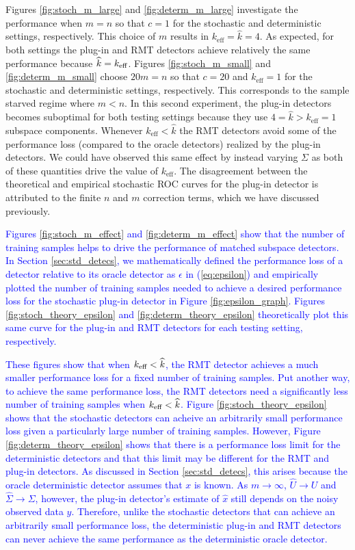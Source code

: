 Figures \ref{fig:stoch_m_large} and \ref{fig:determ_m_large} investigate the performance when $m=n$ so that $c=1$ for the stochastic and deterministic settings, respectively. This choice of $m$ results in $k_\text{eff}=\widehat{k}=4$. As expected, for both settings the plug-in and RMT detectors achieve relatively the same performance because $\widehat{k}=k_\text{eff}$. Figures \ref{fig:stoch_m_small} and \ref{fig:determ_m_small} choose $20m=n$ so that $c=20$ and $k_\text{eff}=1$ for the stochastic and deterministic settings, respectively. This corresponds to the sample starved regime where $m<n$. In this second experiment, the plug-in detectors becomes suboptimal for both testing settings because they use $4=\widehat{k} > k_\text{eff}=1$ subspace components. Whenever $k_\text{eff}<\widehat{k}$ the RMT detectors avoid some of the performance loss (compared to the oracle detectors) realized by the plug-in detectors. We could have observed this same effect by instead varying $\Sigma$ as both of these quantities drive the value of $k_\text{eff}$. The disagreement between the theoretical and empirical stochastic ROC curves for the plug-in detector is attributed to the finite $n$ and $m$ correction terms, which we have discussed previously.

\textcolor{blue}{Figures \ref{fig:stoch_m_effect} and \ref{fig:determ_m_effect} show that the number of training samples helps to drive the performance of matched subspace detectors. In Section \ref{sec:std_detecs}, we mathematically defined the performance loss of a detector relative to its oracle detector as $\epsilon$ in (\ref{eq:epsilon}) and empirically plotted the number of training samples needed to achieve a desired performance loss for the stochastic plug-in detector in Figure \ref{fig:epsilon_graph}. Figures \ref{fig:stoch_theory_epsilon} and \ref{fig:determ_theory_epsilon} theoretically plot this same curve for the plug-in and RMT detectors for each testing setting, respectively.}

\textcolor{blue}{These figures show that when $k_\text{eff}<\widehat{k}$, the RMT detector achieves a much smaller performance loss for a fixed number of training samples. Put another way, to achieve the same performance loss, the RMT detectors need a significantly less number of training samples when $k_\text{eff}<\widehat{k}$. Figure \ref{fig:stoch_theory_epsilon} shows that the stochastic detectors can acheive an arbitrarily small performance loss given a particularly large number of training samples. However, Figure \ref{fig:determ_theory_epsilon} shows that there is a performance loss limit for the deterministic detectors and that this limit may be different for the RMT and plug-in detectors. As discussed in Section \ref{sec:std_detecs}, this arises because the oracle deterministic detector assumes that $x$ is known. As $m\to\infty$, $\widehat{U}\to U$ and $\widehat{\Sigma}\to\Sigma$, however, the plug-in detector's estimate of $\widehat{x}$ still depends on the noisy observed data $y$. Therefore, unlike the stochastic detectors that can achieve an arbitrarily small performance loss, the deterministic plug-in and RMT detectors can never achieve the same performance as the deterministic oracle detector.}

